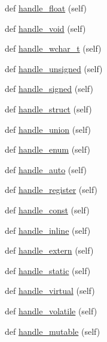 \begin{DoxyCompactItemize}
def \hyperlink{classcpp_1_1ast_1_1AstBuilder_aabe3f6d67124181a8cd2665a4562d4f6}{handle\+\_\+float} (self)
\item 
def \hyperlink{classcpp_1_1ast_1_1AstBuilder_a7a8f94909d4080bad2bc5dabd934057b}{handle\+\_\+void} (self)
\item 
def \hyperlink{classcpp_1_1ast_1_1AstBuilder_a4ec65909aea14f45709733d631aed57b}{handle\+\_\+wchar\+\_\+t} (self)
\item 
def \hyperlink{classcpp_1_1ast_1_1AstBuilder_a793123ea878db159de1662c10bdae897}{handle\+\_\+unsigned} (self)
\item 
def \hyperlink{classcpp_1_1ast_1_1AstBuilder_a61c1e82b2b4fdc337cf360e485851390}{handle\+\_\+signed} (self)
\item 
def \hyperlink{classcpp_1_1ast_1_1AstBuilder_aadfad5b8d50962c04504e806dc0f5b6c}{handle\+\_\+struct} (self)
\item 
def \hyperlink{classcpp_1_1ast_1_1AstBuilder_a9b3fbfb21c6e23f04fd596d590f93eee}{handle\+\_\+union} (self)
\item 
def \hyperlink{classcpp_1_1ast_1_1AstBuilder_a341a6ffabadd444a345c8c98a611774c}{handle\+\_\+enum} (self)
\item 
def \hyperlink{classcpp_1_1ast_1_1AstBuilder_a0cb490894f17a6c34fbe6bb8f7a2e626}{handle\+\_\+auto} (self)
\item 
def \hyperlink{classcpp_1_1ast_1_1AstBuilder_a890e7764fc5fd8ad2da3a62e436278a0}{handle\+\_\+register} (self)
\item 
def \hyperlink{classcpp_1_1ast_1_1AstBuilder_a9d24135000a6fb4a3daabb5ab8883648}{handle\+\_\+const} (self)
\item 
def \hyperlink{classcpp_1_1ast_1_1AstBuilder_ab2eb0c18c07584ef246a46865a17ec40}{handle\+\_\+inline} (self)
\item 
def \hyperlink{classcpp_1_1ast_1_1AstBuilder_a49039750d971240a270606f0608c1ff0}{handle\+\_\+extern} (self)
\item 
def \hyperlink{classcpp_1_1ast_1_1AstBuilder_ad98bc262537d2882adc2017023cef6aa}{handle\+\_\+static} (self)
\item 
def \hyperlink{classcpp_1_1ast_1_1AstBuilder_a44710dc0b8e5bdbecaa56f7c4b59c046}{handle\+\_\+virtual} (self)
\item 
def \hyperlink{classcpp_1_1ast_1_1AstBuilder_a2dfb23ddeb05e1017b3d1ce85a40cacb}{handle\+\_\+volatile} (self)
\item 
def \hyperlink{classcpp_1_1ast_1_1AstBuilder_a6a642353cfe2cddd1a60cbb1011df787}{handle\+\_\+mutable} (self)
\item 

\end{DoxyCompactItemize}
